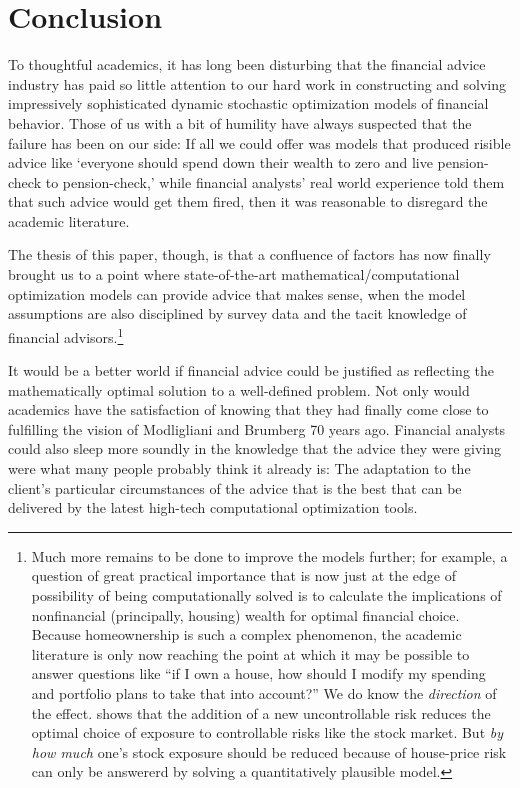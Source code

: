 \documentclass{article}
\begin{document}
\section{Conclusion}

To thoughtful academics, it has long been disturbing that the financial advice industry has paid so little attention to our hard work in constructing and solving impressively sophisticated dynamic stochastic optimization models of financial behavior. Those of us with a bit of humility have always suspected that the failure has been on our side: If all we could offer was models that produced risible advice like `everyone should spend down their wealth to zero and live pension-check to pension-check,' while financial analysts' real world experience told them that such advice would get them fired, then it was reasonable to disregard the academic literature.

The thesis of this paper, though, is that a confluence of factors has now finally brought us to a point where state-of-the-art mathematical/computational optimization models can provide advice that makes sense, when the model assumptions are also disciplined by survey data and the tacit knowledge of financial advisors.\footnote{Much more remains to be done to improve the models further; for example, a question of great practical importance that is now just at the edge of possibility of being computationally solved is to calculate the implications of nonfinancial (principally, housing) wealth for optimal financial choice. Because homeownership is such a complex phenomenon, the academic literature is only now reaching the point at which it may be possible to answer questions like ``if I own a house, how should I modify my spending and portfolio plans to take that into account?'' We do know the \textit{direction} of the effect. \cite{kimballStandardRA} shows that the addition of a new uncontrollable risk reduces the optimal choice of exposure to controllable risks like the stock market. But \textit{by how much} one's stock exposure should be reduced because of house-price risk can only be answererd by solving a quantitatively plausible model.}

It would be a better world if financial advice could be justified as reflecting the mathematically optimal solution to a well-defined problem.  Not only would academics have the satisfaction of knowing that they had finally come close to fulfilling the vision of Modligliani and Brumberg 70 years ago. Financial analysts could also sleep more soundly in the knowledge that the advice they were giving were what many people probably think it already is: The adaptation to the client's particular circumstances of the advice that is the best that can be delivered by the latest high-tech computational optimization tools.
\end{document}
